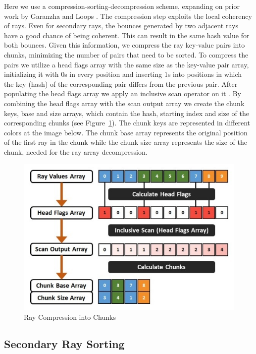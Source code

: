 Here we use a compression-sorting-decompression scheme, expanding on prior work by Garanzha and Loops \cite{Garanzha10}. The compression step exploits the local coherency of rays. Even for secondary rays, the bounces generated by two adjacent rays have a good chance of being coherent. This can result in the same hash value for both bounces. Given this information, we compress the ray key-value pairs into chunks, minimizing the number of pairs that need to be sorted. To compress the pairs we utilize a head flags array with the same size as the key-value pair array, initializing it with $0$s in every position and inserting $1$s into positions in which the key (hash) of the corresponding pair differs from the previous pair. After populating the head flags array we apply an inclusive scan operator on it \cite{Merrill09}. By combining the head flags array with the scan output array we create the chunk keys, base and size arrays, which contain the hash, starting index and size of the corresponding chunks (see Figure~\ref{fig:rcc}). The chunk keys are represented in different colors at the image below. The chunk base array represents the original position of the first ray in the chunk while the chunk size array represents the size of the chunk, needed for the ray array decompression.

\begin{figure}[!htb]
    \centering
    \includegraphics[scale=0.75]{Images/Ray_Compression}
    \caption{\label{fig:rcc}Ray Compression into Chunks}
\end{figure}

\subsection{Secondary Ray Sorting}

